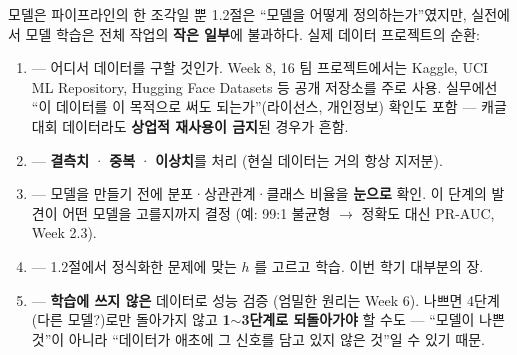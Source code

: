 \begin{frame}{모델은 파이프라인의 한 조각일 뿐}
  1.2절은 ``모델을 어떻게 정의하는가''였지만, 실전에서 모델 학습은
  전체 작업의 \textbf{작은 일부}에 불과하다. 실제 데이터 프로젝트의
  순환:
  \begin{enumerate}
    \item {} --- 어디서 데이터를 구할 것인가. Week 8, 16 팀
      프로젝트에서는 Kaggle, UCI ML Repository, Hugging Face Datasets 등
      공개 저장소를 주로 사용. 실무에선 ``이 데이터를 이 목적으로 써도
      되는가''(라이선스, 개인정보) 확인도 포함 --- 캐글 대회 데이터라도
      \textbf{상업적 재사용이 금지}된 경우가 흔함.
    \item {} --- \textbf{결측치} · \textbf{중복} ·
      \textbf{이상치}를 처리 (현실 데이터는 거의 항상 지저분).
    \item {} --- 모델을 만들기 전에
      분포·상관관계·클래스 비율을 \textbf{눈으로} 확인. 이 단계의 발견이
      어떤 모델을 고를지까지 결정 (예: 99:1 불균형 $\to$
      정확도 대신 PR-AUC, Week 2.3).
    \item {} --- 1.2절에서 정식화한 문제에 맞는 $h$ 를 고르고
      학습. 이번 학기 대부분의 장.
    \item {} --- \textbf{학습에 쓰지 않은} 데이터로 성능 검증
      (엄밀한 원리는 Week 6). 나쁘면 4단계(다른 모델?)로만 돌아가지
      않고 \textbf{1$\sim$3단계로 되돌아가야} 할 수도 ---
      ``모델이 나쁜 것''이 아니라 ``데이터가 애초에 그 신호를 담고 있지
      않은 것''일 수 있기 때문.
  \end{enumerate}
\end{frame}

